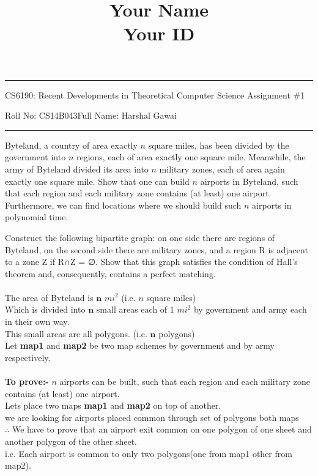 \documentclass[11pt]{exam}
\title{Your Name\\ Your ID}
\author{}
\date{}
\begin{document}
\hrule
\vspace{3mm}
\noindent
{\sf CS6190: Recent Developments in Theoretical Computer Science  \hfill Assignment \#1 }
\vspace{3mm}
\noindent


\noindent
{\sf Roll No: CS14B043\hfill Full Name: Harshal Gawai} 
\vspace{3mm}
\hrule

\begin{questions}
\question Byteland, a country of area exactly $n$ square miles, has been divided by the government into
$n$ regions, each of area exactly one square mile. Meanwhile, the army of Byteland divided
its area into $n$ military zones, each of area again exactly one square mile. Show that one can
build   $n$ airports in Byteland, such that each region and each military zone contains (at least)
one airport. Furthermore, we can find locations where we should build such $n$ airports in
polynomial time.

\begin{solution}
    Construct the following bipartite graph: on one side there are regions of Byteland, on
the second side there are military zones, and a region R is adjacent to a zone Z if R∩Z = ∅.
Show that this graph satisfies the condition of Hall’s theorem and, consequently, contains
a perfect matching.\\\\
    
    The area of Byteland is $\pmb{n}$ $mi^2$ (i.e. $n$ square miles)\\
    Which is divided into $\pmb{n}$ small areas each of $1$ $mi^2$ by government and army each in their own way.\\
    This small areas are all polygons. (i.e. $\pmb{n}$ polygons)\\
    Let \textbf{map1} and \textbf{map2} be two map schemes by government and by army respectively.\\\\

    \textbf{To prove:-} $n$ airports can be built, such that each region and each military zone contains (at least) one airport.\\
    Lets place two maps \textbf{map1} and \textbf{map2} on top of another.\\
    we are looking for airports placed common through set of polygons both maps\\
    $\therefore$ We have to prove that an airport exit common on one polygon of one sheet and another polygon of the other sheet.\\
    i.e. Each airport is common to only two polygons(one from map1 other from map2).\\
    

\end{solution}
\end{questions}
\end{document}
